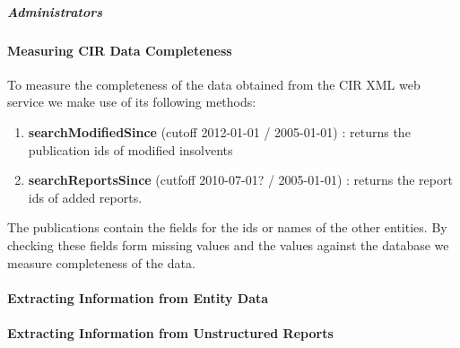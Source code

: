 \subparagraph{Administrators}

\paragraph{Measuring CIR Data Completeness}
To measure the completeness of the data obtained from the CIR XML web service we make use of its following methods\cite{rechtspraak:tech-docs}:
\begin{enumerate}
\item \textbf{searchModifiedSince} (cutoff 2012-01-01 / 2005-01-01) : returns the publication ids of modified insolvents
\item \textbf{searchReportsSince} (cutfoff 2010-07-01? / 2005-01-01) : returns the report ids of added reports.
\end{enumerate}

The publications contain the fields for the ids or names of the other entities. By checking these fields form missing values and the values against the database we measure completeness of the data.

\paragraph{Extracting Information from Entity Data}
\paragraph{Extracting Information from Unstructured Reports}


